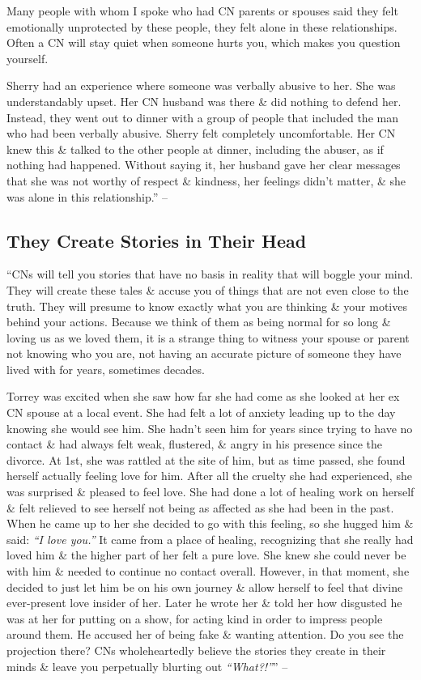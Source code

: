 \documentclass{article}
\numberwithin{equation}{section}
\begin{document}
Many people with whom I spoke who had CN parents or spouses said they felt emotionally unprotected by these people, they felt alone in these relationships. Often a CN will stay quiet when someone hurts you, which makes you question yourself.

Sherry had an experience where someone was verbally abusive to her. She was understandably upset. Her CN husband was there \& did nothing to defend her. Instead, they went out to dinner with a group of people that included the man who had been verbally abusive. Sherry felt completely uncomfortable. Her CN knew this \& talked to the other people at dinner, including the abuser, as if nothing had happened. Without saying it, her husband gave her clear messages that she was not worthy of respect \& kindness, her feelings didn't matter, \& she was alone in this relationship.'' -- \cite[pp. 69--70]{Mirza2017}

\subsection{They Create Stories in Their Head}
``CNs will tell you stories that have no basis in reality that will boggle your mind. They will create these tales \& accuse you of things that are not even close to the truth. They will presume to know exactly what you are thinking \& your motives behind your actions. Because we think of them as being normal for so long \& loving us as we loved them, it is a strange thing to witness your spouse or parent not knowing who you are, not having an accurate picture of someone they have lived with for years, sometimes decades.

Torrey was excited when she saw how far she had come as she looked at her ex CN spouse at a local event. She had felt a lot of anxiety leading up to the day knowing she would see him. She hadn't seen him for years since trying to have no contact \& had always felt weak, flustered, \& angry in his presence since the divorce. At 1st, she was rattled at the site of him, but as time passed, she found herself actually feeling love for him. After all the cruelty she had experienced, she was surprised \& pleased to feel love. She had done a lot of healing work on herself \& felt relieved to see herself not being as affected as she had been in the past. When he came up to her she decided to go with this feeling, so she hugged him \& said: \textit{``I love you.''} It came from a place of healing, recognizing that she really had loved him \& the higher part of her felt a pure love. She knew she could never be with him \& needed to continue no contact overall. However, in that moment, she decided to just let him be on his own journey \& allow herself to feel that divine ever-present love insider of her. Later he wrote her \& told her how disgusted he was at her for putting on a show, for acting kind in order to impress people around them. He accused her of being fake \& wanting attention. Do you see the projection there? CNs wholeheartedly believe the stories they create in their minds \& leave you perpetually blurting out \textit{``What?!''}'' -- \cite[pp. 70--71]{Mirza2017}
\end{document}
